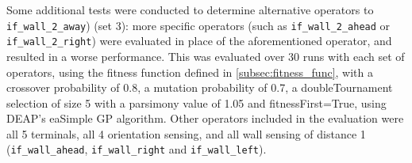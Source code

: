 \documentclass[british,10pt,a4paper]{article}
\begin{document}
Some additional tests were conducted to determine alternative operators to \texttt{if\_wall\_2\_away}) (set 3): more specific operators (such as \texttt{if\_wall\_2\_ahead} or \texttt{if\_wall\_2\_right}) were evaluated in place of the aforementioned operator, and resulted in a worse performance. This was evaluated over 30 runs with each set of operators, using the fitness function defined in \autoref{subsec:fitness_func}, with a crossover probability of 0.8, a mutation probability of 0.7, a doubleTournament selection of size 5 with a parsimony value of 1.05 and fitnessFirst=True, using DEAP's eaSimple GP algorithm. Other operators included in the evaluation were all 5 terminals, all 4 orientation sensing, and all wall sensing of distance 1 (\texttt{if\_wall\_ahead}, \texttt{if\_wall\_right} and \texttt{if\_wall\_left}). 
\end{document}
